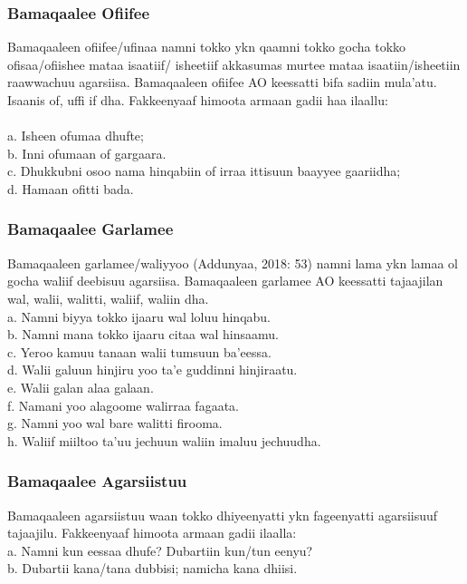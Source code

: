 \documentclass[11pt,b5paper]{book}
\begin{document}
\subsubsection{Bamaqaalee Ofiifee}
Bamaqaaleen ofiifee/ufinaa\cite{Addunya2018} namni tokko ykn qaamni tokko gocha tokko ofisaa/ofiishee mataa isaatiif/ isheetiif akkasumas murtee mataa isaatiin/isheetiin raawwachuu agarsiisa. Bamaqaaleen ofiifee AO keessatti bifa sadiin mula’atu. Isaanis of, uffi if dha\cite{griefenow2001grammatical}. Fakkeenyaaf himoota armaan gadii haa ilaallu:\\
\\
a. Isheen ofumaa dhufte; \\
b. Inni ofumaan of gargaara.\\
c. Dhukkubni osoo nama hinqabiin of irraa ittisuun baayyee gaariidha;\\
d. Hamaan ofitti bada. 

\subsubsection{Bamaqaalee Garlamee}
 
Bamaqaaleen garlamee/waliyyoo\cite{Addunya2018} (Addunyaa, 2018: 53) namni lama ykn lamaa ol gocha waliif deebisuu agarsiisa. Bamaqaaleen garlamee AO keessatti tajaajilan wal, walii, walitti, waliif, waliin dha.
\\
a. Namni biyya tokko ijaaru wal loluu hinqabu.\\
b. Namni mana tokko ijaaru citaa wal hinsaamu.\\
c. Yeroo kamuu tanaan walii tumsuun ba’eessa.\\
d. Walii galuun hinjiru yoo ta’e guddinni hinjiraatu.\\
e. Walii galan alaa galaan.\\
f. Namani yoo alagoome walirraa fagaata.\\
g. Namni yoo wal bare walitti firooma.\\
h. Waliif miiltoo ta’uu jechuun waliin imaluu jechuudha. \\

\subsubsection{Bamaqaalee Agarsiistuu}
Bamaqaaleen agarsiistuu waan tokko dhiyeenyatti ykn fageenyatti agarsiisuuf tajaajilu\cite{griefenow2001grammatical}. Fakkeenyaaf himoota armaan gadii ilaalla:
\\
a. Namni kun eessaa dhufe? Dubartiin kun/tun eenyu?\\
b. Dubartii kana/tana dubbisi; namicha kana dhiisi.\\
\end{document}
